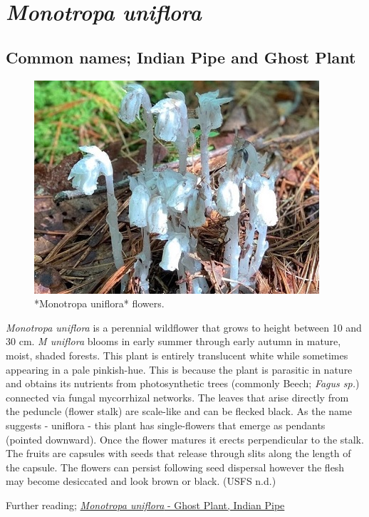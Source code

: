\documentclass[
]{article}
\begin{document}
\hypertarget{monotropa-uniflora}{%
\section{\texorpdfstring{\emph{Monotropa uniflora}}{Monotropa uniflora}}\label{monotropa-uniflora}}

\hypertarget{common-names-indian-pipe-and-ghost-plant}{%
\subsection{Common names; Indian Pipe and Ghost Plant}\label{common-names-indian-pipe-and-ghost-plant}}

\begin{figure}

{\centering \includegraphics[width=0.5\linewidth]{M uniflora} 

}

\caption{*Monotropa uniflora* flowers.}\label{fig:uniflora}
\end{figure}

\emph{Monotropa uniflora} is a perennial wildflower that grows to height between 10 and 30 cm. \emph{M uniflora} blooms in early summer through early autumn in mature, moist, shaded forests. This plant is entirely translucent white while sometimes appearing in a pale pinkish-hue. This is because the plant is parasitic in nature and obtains its nutrients from photosynthetic trees (commonly Beech; \emph{Fagus sp.}) connected via fungal mycorrhizal networks. The leaves that arise directly from the peduncle (flower stalk) are scale-like and can be flecked black. As the name suggests - uniflora - this plant has single-flowers that emerge as pendants (pointed downward). Once the flower matures it erects perpendicular to the stalk. The fruits are capsules with seeds that release through slits along the length of the capsule. The flowers can persist following seed dispersal however the flesh may become desiccated and look brown or black. (USFS n.d.)

Further reading; \href{https://www.fs.fed.us/wildflowers/beauty/mycotrophic/monotropa_uniflora.shtml}{\emph{Monotropa uniflora} - Ghost Plant, Indian Pipe}
\end{document}
